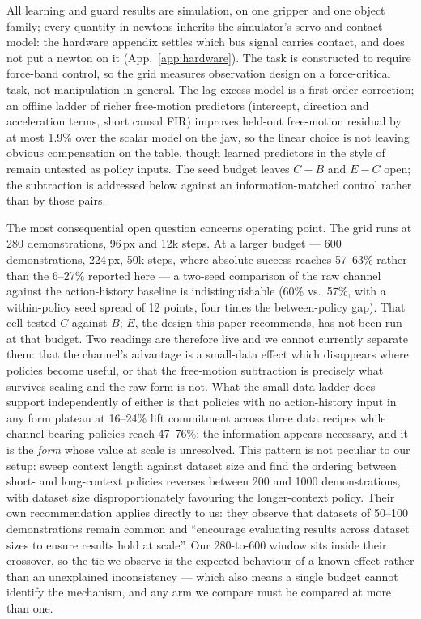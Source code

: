 \documentclass{article}
\begin{document}
All learning and guard results are simulation, on one gripper and one
object family; every quantity in newtons inherits the simulator's servo
and contact model: the hardware appendix settles which bus signal carries
contact, and does not put a newton on it
(App.~\ref{app:hardware}). The task is constructed to require force-band
control, so the grid measures observation design on a force-critical
task, not manipulation in general. The lag-excess model is a first-order
correction; an offline ladder of richer free-motion predictors (intercept,
direction and acceleration terms, short causal FIR) improves held-out
free-motion residual by at most 1.9\% over the scalar model on the jaw,
so the linear choice is not leaving obvious compensation on the table,
though learned predictors in the style of~\citet{oh2026factr2} remain
untested as policy inputs. The seed budget leaves $C{-}B$ and
$E{-}C$ open; the subtraction is addressed below against an
information-matched control rather than by those pairs.

The most consequential open question concerns operating point. The grid
runs at 280 demonstrations, 96\,px and 12k steps. At a larger budget --- 600
demonstrations, 224\,px, 50k steps, where absolute success reaches 57--63\%
rather than the 6--27\% reported here --- a two-seed comparison of the raw
channel against the action-history baseline is indistinguishable (60\% vs.\
57\%, with a within-policy seed spread of 12 points, four times the
between-policy gap). That cell tested $C$ against $B$; $E$, the design this
paper recommends, has not been run at that budget. Two readings are
therefore live and we cannot currently separate them: that the channel's
advantage is a small-data effect which disappears where policies become
useful, or that the free-motion subtraction is precisely what survives
scaling and the raw form is not. What the small-data ladder does support
independently of either is that policies with no action-history input in
any form plateau at 16--24\% lift commitment across three data recipes
while channel-bearing policies reach 47--76\%: the information appears
necessary, and it is the \emph{form} whose value at scale is unresolved.
This pattern is not peculiar to our setup:
\citet{zeng2026revisiting} sweep context length against dataset size and find
the ordering between short- and long-context policies reverses between 200 and
1000 demonstrations, with dataset size disproportionately favouring the
longer-context policy. Their own recommendation applies directly to us: they observe that
datasets of 50--100 demonstrations remain common and ``encourage
evaluating results across dataset sizes to ensure results hold at
scale''. Our 280-to-600 window sits inside their crossover, so the tie we
observe is the expected behaviour of a known effect rather than an
unexplained inconsistency --- which also means a single budget cannot identify
the mechanism, and any arm we compare must be compared at more than one.
\end{document}
